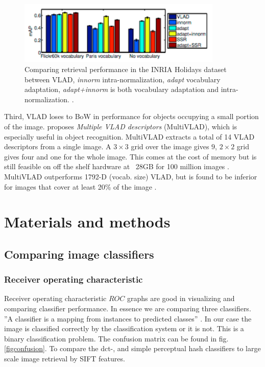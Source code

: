 \documentclass[english,12pt,a4paper,pdftex,elec,utf8]{aaltothesis}
\begin{document}
\begin{figure}[htb]
\begin{center}
\includegraphics[height=3cm]{figures/vladadapt}
\end{center}
\caption{Comparing retrieval performance in the INRIA Holidays dataset between VLAD, \emph{innorm} intra-normalization, \emph{adapt} vocabulary adaptation, \emph{adapt+innorm} is both vocabulary adaptation and intra-normalization. \cite{Arandjelovic2013}.}
\label{vladadapt}
\end{figure}

Third, VLAD loses to BoW in performance for objects occupying a small portion of the image. \cite{Arandjelovic2013} proposes \emph{Multiple VLAD descriptors} (MultiVLAD), which is especially useful in object recognition. MultiVLAD extracts a total of 14 VLAD descriptors from a single image. A $3 \times 3$ grid over the image gives $9$, $2 \times 2$ grid gives four and one for the whole image. This comes at the cost of memory but is still feasible on off the shelf hardware at ~28GB for 100 million images \cite{Arandjelovic2013}. MultiVLAD outperforms 1792-D (vocab. size) VLAD, but is found to be inferior for images that cover at least 20\% of the image \cite{Arandjelovic2013}.




\clearpage

\section{Materials and methods}
\subsection{Comparing image classifiers}
\subsubsection{Receiver operating characteristic}
Receiver operating characteristic \(ROC\) graphs are good in visualizing and comparing classifier performance. In essence we are comparing three classifiers. ''A classifier is a mapping from instances to predicted classes'' \cite{Fawcett2006}. In our case the image is classified correctly by the classification system or it is not. This is a binary classification problem. The confusion matrix can be found in fig. \ref{figconfusion}. To compare the dct-, and simple perceptual hash classifiers to large scale image retrieval by SIFT features.
\end{document}

